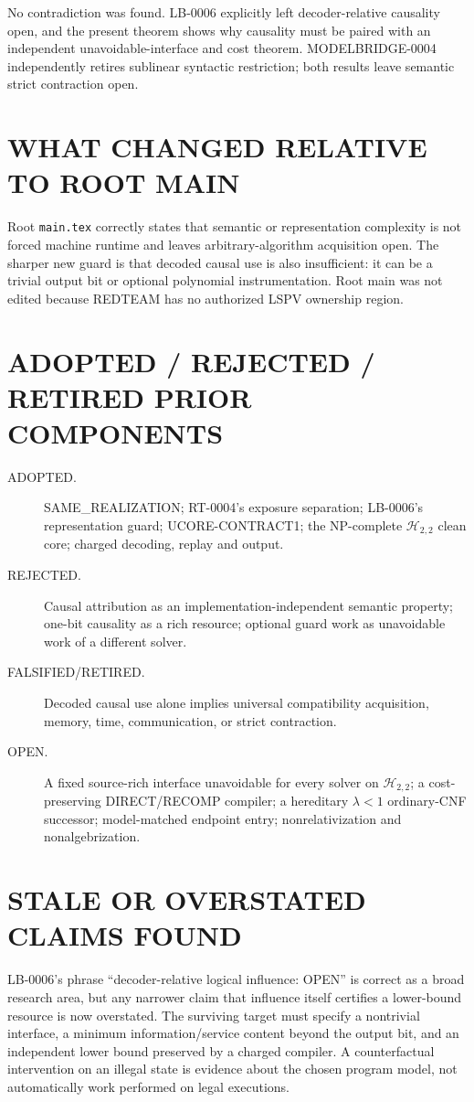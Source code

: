 \documentclass[11pt]{article}
\begin{document}
No contradiction was found.  LB-0006 explicitly left decoder-relative
causality open, and the present theorem shows why causality must be paired
with an independent unavoidable-interface and cost theorem.  MODELBRIDGE-0004
independently retires sublinear syntactic restriction; both results leave
semantic strict contraction open.

\section{WHAT CHANGED RELATIVE TO ROOT MAIN}
Root \texttt{main.tex} correctly states that semantic or representation
complexity is not forced machine runtime and leaves arbitrary-algorithm
acquisition open.  The sharper new guard is that decoded causal use is also
insufficient: it can be a trivial output bit or optional polynomial
instrumentation.  Root main was not edited because REDTEAM has no authorized
LSPV ownership region.

\section{ADOPTED / REJECTED / RETIRED PRIOR COMPONENTS}
\begin{description}
\item[ADOPTED.] SAME\_REALIZATION; RT-0004's exposure separation; LB-0006's
representation guard; UCORE-CONTRACT1; the NP-complete
$\mathcal H_{2,2}$ clean core; charged decoding, replay and output.
\item[REJECTED.] Causal attribution as an implementation-independent
semantic property; one-bit causality as a rich resource; optional guard work
as unavoidable work of a different solver.
\item[FALSIFIED/RETIRED.] Decoded causal use alone implies universal
compatibility acquisition, memory, time, communication, or strict contraction.
\item[OPEN.] A fixed source-rich interface unavoidable for every solver on
$\mathcal H_{2,2}$; a cost-preserving DIRECT/RECOMP compiler; a hereditary
$\lambda<1$ ordinary-CNF successor; model-matched endpoint entry;
nonrelativization and nonalgebrization.
\end{description}

\section{STALE OR OVERSTATED CLAIMS FOUND}
LB-0006's phrase ``decoder-relative logical influence: OPEN'' is correct as a
broad research area, but any narrower claim that influence itself certifies a
lower-bound resource is now overstated.  The surviving target must specify a
nontrivial interface, a minimum information/service content beyond the output
bit, and an independent lower bound preserved by a charged compiler.  A
counterfactual intervention on an illegal state is evidence about the chosen
program model, not automatically work performed on legal executions.
\end{document}

